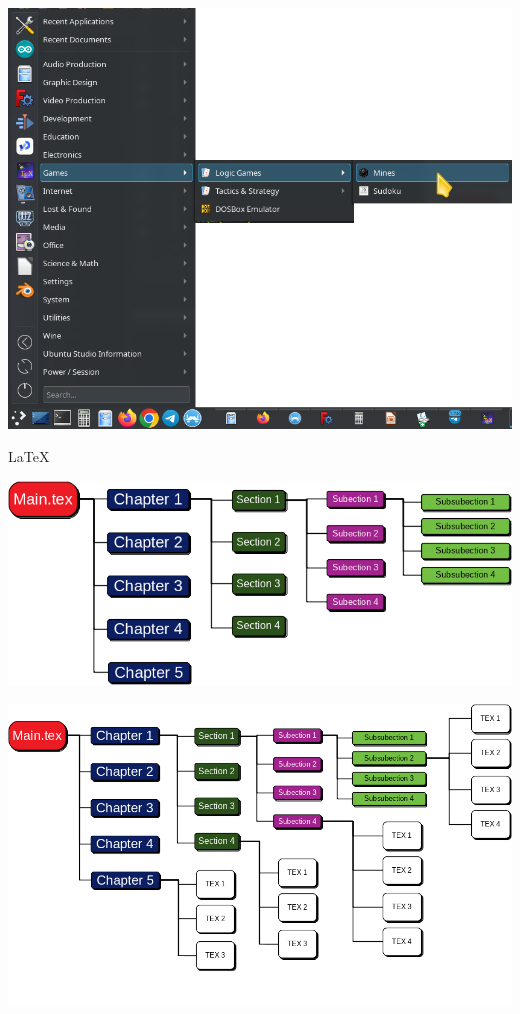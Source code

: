\begin{center}
	\includegraphics[height=\textheight]{./IMG-GIT/menu.png}
\end{center}
\pagebreak

{\Huge \LaTeX}
\begin{center}
	\includegraphics[width=\linewidth]{./IMG-GIT/SVG/DIAGRAMAS2.png}
\end{center}
\pagebreak

\begin{center}
	\includegraphics[height=\textheight]{./IMG-GIT/SVG/DIAGRAMAS3.png}
\end{center}
\pagebreak

